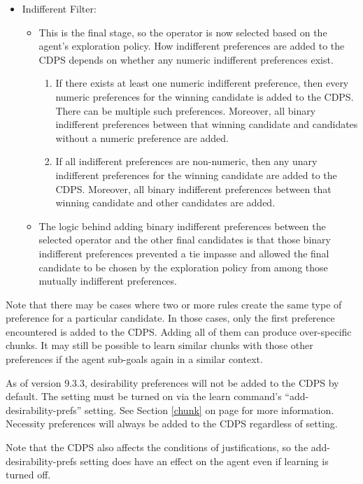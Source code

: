 \begin{itemize}
\item Indifferent Filter: 
\begin{itemize}
\item This is the final stage, so the operator is now selected based on the
agent's exploration policy.  How indifferent preferences are added to the CDPS
depends on whether any numeric indifferent preferences exist.
\begin{enumerate}
\item If there exists at least one numeric indifferent preference, then every
numeric preferences for the winning candidate is added to the CDPS.  There can
be multiple such preferences. Moreover, all binary indifferent preferences
between that winning candidate and candidates without a numeric preference are
added.
\item If all indifferent preferences are non-numeric, then any unary indifferent
preferences for the winning candidate are added to the CDPS.  Moreover, all
binary indifferent preferences between that winning candidate and other
candidates are added.
\end{enumerate}
\item The logic behind adding binary indifferent preferences between the
selected operator and the other final candidates is that those binary
indifferent preferences prevented a tie impasse and allowed the final
candidate to be chosen by the exploration policy from among those mutually
indifferent preferences.
\end{itemize}
\end{itemize}

Note that there may be cases where two or more rules create the same type of
preference for a particular candidate.  In those cases, only the first
preference encountered is added to the CDPS.  Adding all of them can produce
over-specific chunks.  It may still be
possible to learn similar chunks with those other preferences if the agent sub-goals
again in a similar context.

As of version 9.3.3, desirability preferences will not be added to the CDPS by
default.  The setting must be turned on via the learn command's
“add-desirability-prefs” setting.  See Section \ref{chunk} on page \pageref{chunk} for more
information.  Necessity preferences will always be added to the CDPS regardless
of setting.

Note that the CDPS also affects the conditions of justifications, so the
add-desirability-prefs setting does have an effect on the agent even if learning
is turned off.

